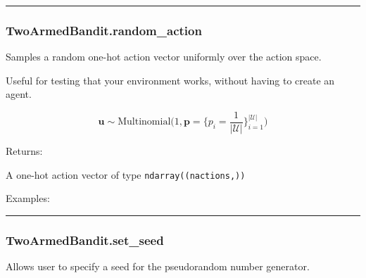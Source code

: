 \begin{center}\rule{0.5\linewidth}{\linethickness}\end{center}

\subsubsection{TwoArmedBandit.random\_action}\label{twoarmedbandit.random_action}

\begin{Shaded}
\begin{Highlighting}[]
\NormalTok{)}
\end{Highlighting}
\end{Shaded}

Samples a random one-hot action vector uniformly over the action space.

Useful for testing that your environment works, without having to create
an agent.

\[
\mathbf u \sim \mathrm{Multinomial}\Big(1, \mathbf p=\{p_i = \frac{1}{|\mathcal U|}\}_{i=1}^{|\mathcal U|}\Big)
\]

Returns:

A one-hot action vector of type \texttt{ndarray((nactions,))}

Examples:

\begin{Shaded}
\begin{Highlighting}[]
\OperatorTok{=}
\end{Highlighting}
\end{Shaded}

\begin{center}\rule{0.5\linewidth}{\linethickness}\end{center}

\subsubsection{TwoArmedBandit.set\_seed}\label{twoarmedbandit.set_seed}

\begin{Shaded}
\begin{Highlighting}[]
\OperatorTok{=}\NormalTok{)}
\end{Highlighting}
\end{Shaded}

Allows user to specify a seed for the pseudorandom number generator.

